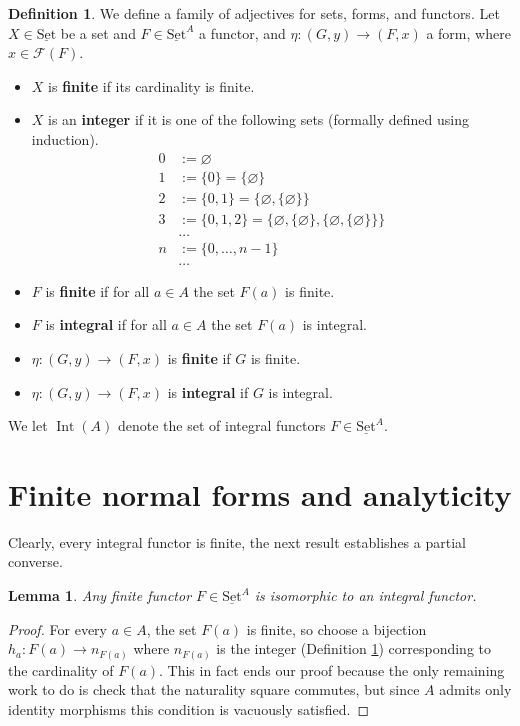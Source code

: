 \documentclass[12pt]{article}
\theoremstyle{plain}
\newtheorem{lemma}[thm]{Lemma}
\theoremstyle{definition}
\newtheorem{defn}[thm]{Definition} %
\newcommand{\scr}[1]{\mathscr{#1}}
\newcommand{\lto}{\longrightarrow}
\newcommand{\set}{\operatorname{\underline{Set}}}
\begin{document}
	\begin{defn}\label{def:integer}
		We define a family of adjectives for sets, forms, and functors. Let $X \in \set$ be a set and $F \in \set^A$ a functor, and $\eta: (G,y) \lto (F,x)$ a form, where $x \in \scr{F}(F)$.
		\begin{itemize}
			\item $X$ is \textbf{finite} if its cardinality is finite.
			\item $X$ is an \textbf{integer} if it is one of the following sets (formally defined using induction).
			\begin{align*}
				0 &:= \varnothing\\
				1 &:= \lbrace 0 \rbrace = \lbrace \varnothing \rbrace\\
				2 &:= \lbrace 0, 1 \rbrace = \big\lbrace \varnothing, \lbrace \varnothing \rbrace \big\rbrace\\
				3 &:= \lbrace 0, 1, 2 \rbrace = \big\lbrace \varnothing, \lbrace \varnothing \rbrace, \lbrace  \varnothing , \lbrace \varnothing \rbrace \rbrace \big\rbrace\\
				&\hdots\\
				n &:= \lbrace 0, \hdots, n-1 \rbrace\\
				&\hdots
			\end{align*}
		\item $F$ is \textbf{finite} if for all $a \in A$ the set $F(a)$ is finite.
		\item $F$ is \textbf{integral} if for all $a \in A$ the set $F(a)$ is integral.
		\item $\eta: (G,y) \lto (F,x)$ is \textbf{finite} if $G$ is finite.
		\item $\eta: (G,y) \lto (F,x)$ is \textbf{integral} if $G$ is integral.
			\end{itemize}
		We let $\operatorname{Int}(A)$ denote the set of integral functors $F \in \set^A$.
		\end{defn}
	
	\section{Finite normal forms and analyticity}
	Clearly, every integral functor is finite, the next result establishes a partial converse.
	\begin{lemma}\label{lem:finite--->integral}
		Any finite functor $F \in \set^A$ is isomorphic to an integral functor.
		\end{lemma}
	\begin{proof}
		For every $a \in A$, the set $F(a)$ is finite, so choose a bijection $h_a: F(a) \lto n_{F(a)}$ where $n_{F(a)}$ is the integer (Definition \ref{def:integer}) corresponding to the cardinality of $F(a)$. This in fact ends our proof because the only remaining work to do is check that the naturality square commutes, but since $A$ admits only identity morphisms this condition is vacuously satisfied.
		\end{proof}
	
\end{document}
